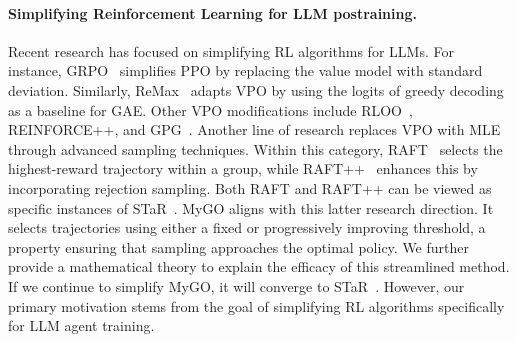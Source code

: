 \paragraph{Simplifying Reinforcement Learning for LLM postraining.}
Recent research has focused on simplifying RL algorithms for LLMs.
For instance, GRPO~\cite{shao2024deepseekmath} simplifies PPO by replacing the value model with standard deviation.
Similarly, ReMax~\cite{li2024remax} adapts VPO by using the logits of greedy decoding as a baseline for GAE.
Other VPO modifications include RLOO~\cite{ahmadian2024back}, REINFORCE++\cite{hu2025reinforce++}, and GPG~\cite{chu2025gpg}.
Another line of research replaces VPO with MLE through advanced sampling techniques. Within this category, RAFT~\cite{zhang2024raftadaptinglanguagemodel} selects the highest-reward trajectory within a group, while RAFT++~\cite{xiong2025minimalist} enhances this by incorporating rejection sampling. Both RAFT and RAFT++ can be viewed as specific instances of STaR~\cite{zelikman2022star}.
MyGO aligns with this latter research direction. It selects trajectories using either a fixed or progressively improving threshold, a property ensuring that sampling approaches the optimal policy. We further provide a mathematical theory to explain the efficacy of this streamlined method.
If we continue to simplify MyGO, it will converge to STaR~\cite{zelikman2022star}.
However, our primary motivation stems from the goal of simplifying RL algorithms specifically for LLM agent training.





\newpage
